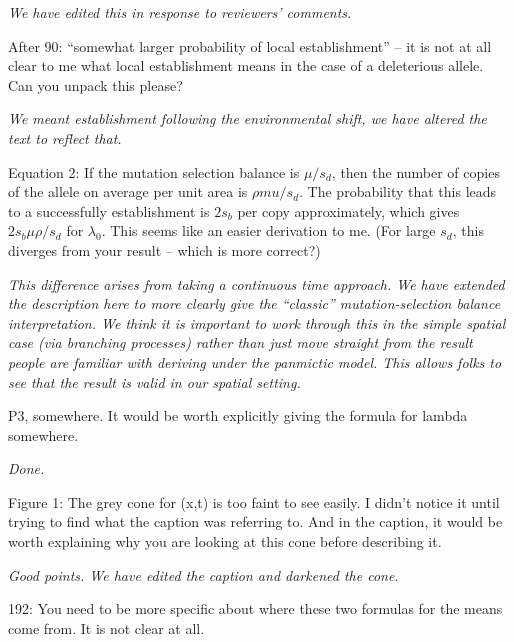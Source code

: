 \documentclass[12pt,letterpaper]{article}
\newcommand{\gc}[1]{{ \color{red} #1}}
\newcommand{\plr}[1]{{ \color{green} #1}}
\newcommand{\response}[1]{\emph{ \color{blue} #1}}
\begin{document}
\response{We have edited this in response to reviewers' comments.}


After 90: ``somewhat larger probability of local establishment'' -- it is not at all clear to me what local establishment means in the case of a deleterious allele. Can you unpack this please?

\response{We meant establishment following the environmental shift, we have altered the text to reflect that.}

Equation 2: If the mutation selection balance is $\mu/s_d$, then the number of copies of the allele on average per unit area is $\rho mu/ s_d$. The probability that this leads to a successfully establishment is $2 s_b$ per copy approximately, which gives $2 s_b \mu \rho / s_d$ for $\lambda_0$. This seems like an easier derivation to me. (For large $s_d$, this diverges from your result -- which is more correct?)

\response{This difference arises from taking a continuous time approach. We have extended the description here to more clearly give the ``classic'' mutation-selection balance interpretation. We think it is important to work through this in the simple spatial case (via branching processes) rather than just move straight from the result people are familiar with deriving under the panmictic model. This allows folks to see that the result is valid in our spatial setting. }


P3, somewhere. It would be worth explicitly giving the formula for lambda somewhere.

\response{Done.}

Figure 1: The grey cone for (x,t) is too faint to see easily. I didn't notice it until trying to find what the caption was referring to. And in the caption, it would be worth explaining why you are looking at this cone before describing it. 

\response{Good points. We have edited the caption and darkened the cone. }

192: You need to be more specific about where these two formulas for the means come from. It is not clear at all.
\end{document}

